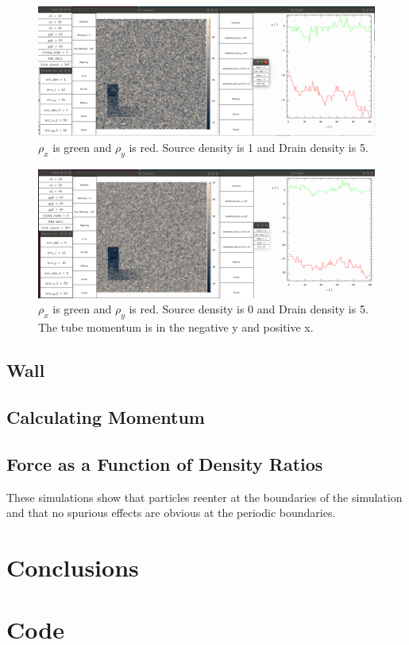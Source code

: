 \documentclass{article}
\begin{document}
\begin{figure}[H]
\centering
\includegraphics[scale=0.25]{source_1_drain_4.png}
\caption{\label{fig} $\rho_x$ is green and $\rho_y$ is red. Source density is 1 and Drain density is 5.}
\end{figure}

\begin{figure}[H]
\centering
\includegraphics[scale=0.25]{source_0_drain_5.png}
\caption{\label{fig} $\rho_x$ is green and $\rho_y$ is red. Source density is 0 and Drain density is 5. The tube momentum is in the negative y and positive x.}
\end{figure}






\subsection{Wall}
\subsection{Calculating Momentum}
\subsection{Force as a Function of Density Ratios}



These simulations show that particles reenter at the boundaries of the simulation and that no spurious effects are obvious at the periodic boundaries.

\section{Conclusions}



\appendix
\section{Code}

\end{document}
